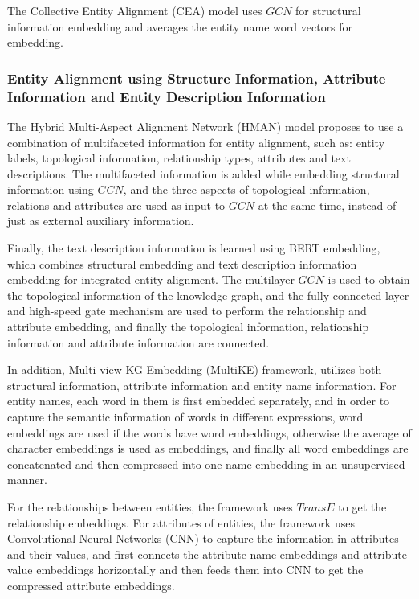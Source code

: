 \documentclass[sigconf]{acmart}
\begin{document}
{The Collective Entity Alignment (CEA) \cite{zeng2020collective} model uses $GCN$ for structural information embedding and averages the entity name word vectors for embedding.

\subsubsection{Entity Alignment using Structure Information, Attribute Information and Entity Description Information}

The Hybrid Multi-Aspect Alignment Network (HMAN) \cite{yang2019aligning} model proposes to use a combination of multifaceted information for entity alignment, such as: entity labels, topological information, relationship types, attributes and text descriptions. The multifaceted information is added while embedding structural information using $GCN$, and the three aspects of topological information, relations and attributes are used as input to $GCN$ at the same time, instead of just as external auxiliary information. 

Finally, the text description information is learned using BERT embedding, which combines structural embedding and text description information embedding for integrated entity alignment. The multilayer $GCN$ is used to obtain the topological information of the knowledge graph, and the fully connected layer and high-speed gate mechanism are used to perform the relationship and attribute embedding, and finally the topological information, relationship information and attribute information are connected.

In addition, Multi-view KG Embedding (MultiKE) \cite{zhang2019multi} framework, utilizes both structural information, attribute information and entity name information. For entity names, each word in them is first embedded separately, and in order to capture the semantic information of words in different expressions, word embeddings are used if the words have word embeddings, otherwise the average of character embeddings is used as embeddings, and finally all word embeddings are concatenated and then compressed into one name embedding in an unsupervised manner. 

For the relationships between entities, the framework uses $TransE$ to get the relationship embeddings. For attributes of entities, the framework uses Convolutional Neural Networks (CNN) to capture the information in attributes and their values, and first connects the attribute name embeddings and attribute value embeddings horizontally and then feeds them into CNN to get the compressed attribute embeddings.

}
\end{document}
